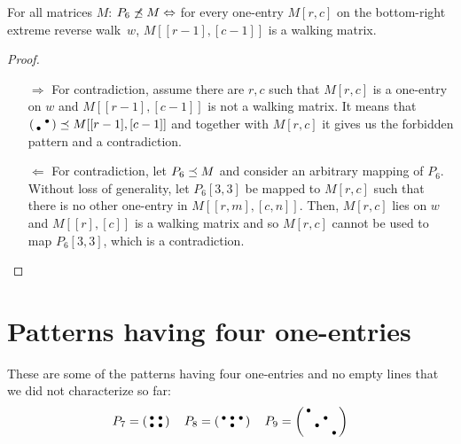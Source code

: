 \begin{prop}
For all matrices $M$: $P_6\not\preceq M\Leftrightarrow$ for every one-entry $M[r,c]$ on the bottom-right extreme reverse walk~$w$, $M[[r-1],[c-1]]$ is a walking matrix.
\end{prop}
\begin{proof}
\begin{itemize}
	\item[$\Rightarrow$] For contradiction, assume there are $r,c$ such that $M[r,c]$ is a one-entry on $w$ and $M[[r-1],[c-1]]$ is not a walking matrix. It means that $\left(\begin{smallmatrix} &\bullet\\\bullet& \end{smallmatrix}\right)\preceq M[[r-1],[c-1]]$ and together with $M[r,c]$ it gives us the forbidden pattern and a contradiction.
	\item[$\Leftarrow$] For contradiction, let $P_6\preceq M$ and consider an arbitrary mapping of $P_6$. Without loss of generality, let $P_6[3,3]$ be mapped to $M[r,c]$ such that there is no other one-entry in $M[[r,m],[c,n]]$. Then, $M[r,c]$ lies on $w$ and $M[[r],[c]]$ is a walking matrix and so $M[r,c]$ cannot be used to map $P_6[3,3]$, which is a contradiction. \qedhere
\end{itemize}
\end{proof}

\section{Patterns having four one-entries}
\label{sec:4ones}
These are some of the patterns having four one-entries and no empty lines that we did not characterize so far:
$$P_7=\smm{\bullet&\bullet\\\bullet&\bullet}\ \ 
\ P_8=\smm{\bullet&\bullet&\bullet\\ &\bullet& }\ \ 
\ P_9=\smm{\bullet& & & \\ & &\bullet& \\ &\bullet& & \\ & & &\bullet}$$

